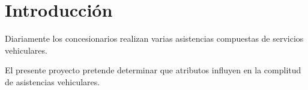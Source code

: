 \section{Introducci\'on}
Diariamente los concesionarios realizan varias asistencias compuestas de servicios
vehiculares.

El presente proyecto pretende determinar que atributos influyen en la complitud de
asistencias vehiculares.

